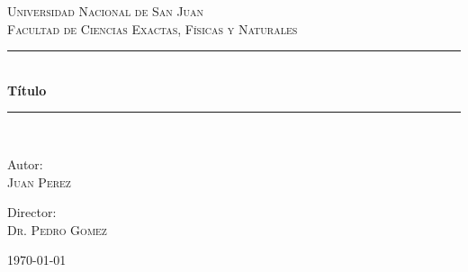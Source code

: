 \begin{titlepage}
\center %

\textsc{\LARGE Universidad Nacional de San Juan}\\[1cm]
\textsc{\Large Facultad de Ciencias Exactas, Físicas y Naturales}\\[1cm]

\rule{\linewidth}{0.5mm}\\[0.5cm]

\textbf{\huge Título}

\rule{\linewidth}{0.5mm}\\[1.8cm]

\begin{minipage}{0.4\textwidth}
\large
\begin{flushleft}
Autor:\\
\textsc{Juan Perez}
\end{flushleft}
\end{minipage}
\begin{minipage}{0.4\textwidth}
\large
\begin{flushright}
Director:\\
\textsc{Dr. Pedro Gomez}
\end{flushright}
\end{minipage}


\vspace{\fill}
{\large \today{}}

\clearpage{} %
\thispagestyle{empty} %

\end{titlepage}
